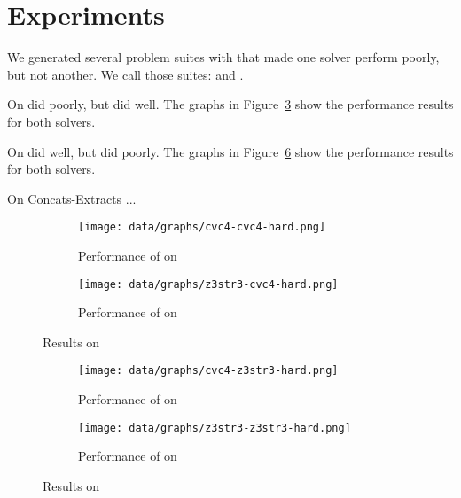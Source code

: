 \section{Experiments}

    We generated several problem suites with \fuzzer{} that made one solver perform poorly, but not another. We call those suites: \cHard{} and \zHard{}.

    On \cHard{} \cvc{} did poorly, but \us{} did well. The graphs in Figure~\ref{fig:cvc4-hard} show the performance results for both solvers.

    On \zHard{} \cvc{} did well, but \us{} did poorly. The graphs in Figure~\ref{fig:z3str3-hard} show the performance results for both solvers.


    On Concats-Extracts ...

    \begin{figure}[H]
        \begin{subfigure}{.5\textwidth}
            \texttt{[image: data/graphs/cvc4-cvc4-hard.png]}
            \caption{Performance of \cvc{} on \cHard{}}
            \label{fig:cvc4-cvc4-hard}
        \end{subfigure}
        \begin{subfigure}{.5\textwidth}
            \texttt{[image: data/graphs/z3str3-cvc4-hard.png]}
            \caption{Performance of \us{} on \cHard{}}
            \label{fig:z3str3-cvc4-hard}
        \end{subfigure}
        \caption{Results on \cHard}
        \label{fig:cvc4-hard}
    \end{figure}

    \begin{figure}[H]
        \begin{subfigure}{.5\textwidth}
            \texttt{[image: data/graphs/cvc4-z3str3-hard.png]}
            \caption{Performance of \cvc{} on \zHard{}}
            \label{fig:cvc4-z3str3-hard}
        \end{subfigure}
        \begin{subfigure}{.5\textwidth}
            \texttt{[image: data/graphs/z3str3-z3str3-hard.png]}
            \caption{Performance of \us{} on \zHard{}}
            \label{fig:z3str3-z3str3-hard}
        \end{subfigure}
        \caption{Results on \zHard}
        \label{fig:z3str3-hard}
    \end{figure}

